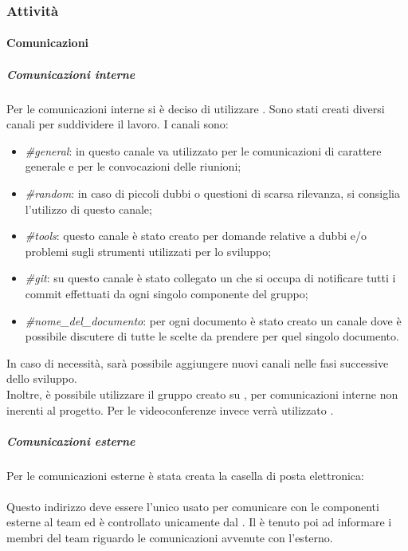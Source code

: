 \subsubsection{Attività}
	\paragraph{Comunicazioni}
		\subparagraph{Comunicazioni interne}
		Per le comunicazioni interne si è deciso di utilizzare . Sono stati creati diversi canali per suddividere il lavoro. I canali sono:
		\begin{itemize}
			\item \textit{\#general}: in questo canale va utilizzato per le comunicazioni di carattere generale e per le convocazioni delle riunioni; 
			\item \textit{\#random}: in caso di piccoli dubbi o questioni di scarsa rilevanza, si consiglia l'utilizzo di questo canale; 
			\item \textit{\#tools}: questo canale è stato creato per domande relative a dubbi e/o problemi sugli strumenti utilizzati per lo sviluppo;
			\item \textit{\#git}: su questo canale è stato collegato un  che si occupa di notificare tutti i commit effettuati da ogni singolo componente del gruppo;
			\item \textit{\#nome\_del\_documento}: per ogni documento è stato creato un canale dove è possibile discutere di tutte le scelte da prendere per quel singolo documento.
		\end{itemize}
		In caso di necessità, sarà possibile aggiungere nuovi canali nelle fasi successive dello sviluppo. \\
		Inoltre, è possibile utilizzare il gruppo creato su , per comunicazioni interne non inerenti al progetto. Per le videoconferenze invece verrà utilizzato .
		\subparagraph{Comunicazioni esterne}
		Per le comunicazioni esterne è stata creata la casella di posta elettronica: \\
		\highlight{\EMAIL}\\
		Questo indirizzo deve essere l'unico usato per comunicare con le componenti esterne al team ed è controllato unicamente dal \RES. Il \RES è tenuto poi ad informare i membri del team riguardo le comunicazioni avvenute con l'esterno.
